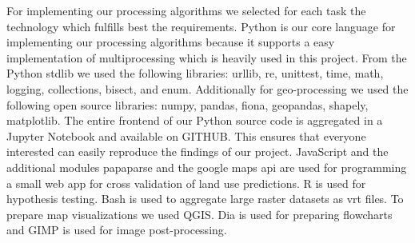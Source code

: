 	For implementing our processing algorithms we selected for each task the technology which fulfills best the requirements. Python is our core language for implementing our processing algorithms because it supports a easy implementation of multiprocessing which is heavily used in this project. From the Python \ac{stdlib} we used the following libraries: urllib, re, unittest, time, math, logging, collections, bisect, and enum. Additionally for geo-processing we used the following open source libraries: numpy, pandas, fiona, geopandas, shapely, matplotlib. The entire frontend of our Python source code is aggregated in a Jupyter Notebook and available on GITHUB. This ensures that everyone interested can easily reproduce the findings of our project. JavaScript and the additional modules papaparse and the google maps api are used for programming a small web app for cross validation of land use predictions. R is used for hypothesis testing. Bash is used to aggregate large raster datasets as vrt files. To prepare map visualizations we used QGIS. Dia is used for preparing flowcharts and GIMP is used for image post-processing.

